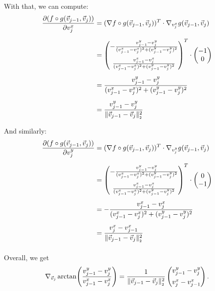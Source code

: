 \begin{proposition}
\begin{center}
	\end{center}

	With that, we can compute:
	\begin{align*}
		\frac{\partial (f \circ g (\vec{v}_{j-1}, \vec{v}_j))}{\partial v_j^{x}} &= (\nabla f \circ g (\vec{v}_{j-1}, \vec{v}_j))^T \cdot \nabla_{v_j^{x}} g (\vec{v}_{j-1}, \vec{v}_j) \\[0.5em]
		&= \begin{pmatrix}
			- \frac{v_{j-1}^{y} - v_{j}^{y}}{(v_{j-1}^{x} - v_{j}^{x})^2 + (v_{j-1}^{y} - v_{j}^{y})^2} \\[1.0em]
			\frac{v_{j-1}^{x} - v_{j}^{x}}{(v_{j-1}^{x} - v_{j}^{x})^2 + (v_{j-1}^{y} - v_{j}^{y})^2}
		\end{pmatrix}^T
		\cdot 
		\begin{pmatrix}
			-1 \\
			0
		\end{pmatrix} \\[0.5em]
		&= \frac{v_{j-1}^{y} - v_{j}^{y}}{(v_{j-1}^{x} - v_{j}^{x})^2 + (v_{j-1}^{y} - v_{j}^{y})^2} \\[0.5em]
		&= \frac{v_{j-1}^{y} - v_{j}^{y}}{\norm[\vec{v}_{j-1} - \vec{v}_j]^2}
	\end{align*}

	And similarly:
	\begin{align*}
		\frac{\partial (f \circ g (\vec{v}_{j-1}, \vec{v}_j))}{\partial v_j^{y}} &= (\nabla f \circ g (\vec{v}_{j-1}, \vec{v}_j))^T \cdot \nabla_{v_j^{y}} g (\vec{v}_{j-1}, \vec{v}_j) \\[0.5em]
		&= \begin{pmatrix}
			- \frac{v_{j-1}^{y} - v_{j}^{y}}{(v_{j-1}^{x} - v_{j}^{x})^2 + (v_{j-1}^{y} - v_{j}^{y})^2} \\[1.0em]
			\frac{v_{j-1}^{x} - v_{j}^{x}}{(v_{j-1}^{x} - v_{j}^{x})^2 + (v_{j-1}^{y} - v_{j}^{y})^2}
		\end{pmatrix}^T
		\cdot 
		\begin{pmatrix}
			0 \\
			-1
		\end{pmatrix} \\[0.5em]
		&= - \frac{v_{j-1}^{x} - v_{j}^{x}}{(v_{j-1}^{x} - v_{j}^{x})^2 + (v_{j-1}^{y} - v_{j}^{y})^2} \\[0.5em]
		&= \frac{v_{j}^{x} - v_{j-1}^{x}}{\norm[\vec{v}_{j-1} - \vec{v}_j]^2} \\[0.5em]
	\end{align*}

	Overall, we get 
	\begin{align*}
		\nabla_{\vec{v}_j} \arctan\! \left(\frac{v_{j-1}^{y} - v_{j}^{y}}{v_{j-1}^{x} - v_{j}^{x}} \right) = \frac{1}{\norm[\vec{v}_{j-1} - \vec{v}_j]^2} \begin{pmatrix}
			v_{j-1}^{y} - v_{j}^{y} \\[0.5em]
			v_{j}^{x} - v_{j-1}^{x}
		\end{pmatrix}.
	\end{align*}
	

\end{proposition}
